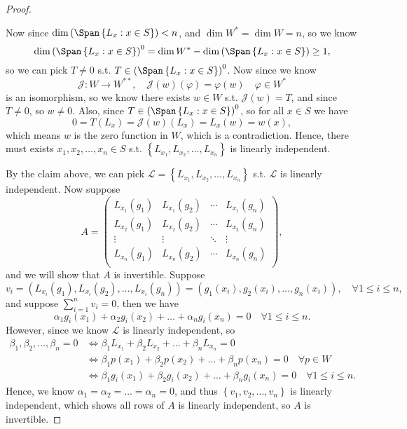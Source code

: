 \begin{proof}
\begin{explanation}
        Now since \(\dim \left( \Span \left\{ L_x: x \in S \right\}  \right) < n \), and \(\dim W^* = \dim W = n\), so we know 
        \[
            \dim \left( \Span \left\{ L_x : x \in S \right\}  \right)^0 = \dim W^* - \dim \left( \Span \left\{ L_x: x \in S \right\}  \right) \ge 1, 
        \] so we can pick \(T \neq 0\) s.t. \(T \in \left( \Span \left\{ L_x: x \in S \right\}  \right)^0 \). Now since we know 
        \[
            \mathcal{J} : W \to W^{* *}, \quad \mathcal{J} (w) (\varphi ) = \varphi (w) \quad \varphi \in W^*
        \] is an isomorphism, so we know there exists \(w \in W\) s.t. \(\mathcal{J} (w) = T\), and since \(T \neq 0\), so \(w \neq 0\). Also, since \(T \in \left( \Span \left\{ L_x : x \in S \right\}  \right)^0 \), so for all \(x \in S\) we have 
        \[
            0 = T(L_x) = \mathcal{J} (w) (L_x) = L_x(w) = w(x),
        \] which means \(w\) is the zero function in \(W\), which is a contradiction. Hence, there must exists \(x_1, x_2, \dots , x_n \in S\) s.t. \(\left\{ L_{x_1}, L_{x_2}, \dots , L_{x_n} \right\} \) is linearly independent. 
    \end{explanation} 
    By the claim above, we can pick \(\mathcal{L} = \left\{ L_{x_1}, L_{x_2}, \dots , L_{x_n} \right\} \) s.t. \(\mathcal{L} \) is linearly independent. Now suppose 
    \[
        A = \begin{pmatrix}
            L_{x_1}(g_1) & L_{x_1}(g_2) &  \cdots & L_{x_1}(g_n)  \\
            L_{x_2}(g_1) & L_{x_2}(g_2) & \cdots & L_{x_2}(g_n)  \\
            \vdots & \vdots & \ddots & \vdots  \\
            L_{x_n}(g_1) & L_{x_n}(g_2) & \cdots & L_{x_n}(g_n)  \\
        \end{pmatrix},
    \] and we will show that \(A\) is invertible. Suppose 
    \[
        v_i = \left( L_{x_i}(g_1), L_{x_i}(g_2), \dots , L_{x_i}(g_n) \right) = \left( g_1(x_i), g_2(x_i), \dots, g_n(x_i)  \right),  \quad \forall 1 \le i \le n, 
    \] and suppose \(\sum_{i=1}^n v_i = 0 \), then we have 
    \[
        \alpha _1 g_i(x_1) + \alpha _2 g_i (x_2) + \dots + \alpha _n g_i(x_n) = 0 \quad \forall 1 \le i \le n.
    \] 
    However, since we know \(\mathcal{L} \) is linearly independent, so 
    \begin{align*}
        \beta _1, \beta _2, \dots , \beta _n = 0 &\iff \beta _1 L_{x_1} + \beta _2 L_{x_2} + \dots + \beta _n L_{x_n} = 0 \\
        &\iff \beta _1 p(x_1) + \beta _2 p(x_2) + \dots + \beta _n p(x_n) = 0 \quad \forall p \in W \\
        &\iff \beta _1 g_i(x_1) + \beta _2 g_i(x_2) + \dots + \beta _n g_i(x_n) = 0 \quad \forall 1 \le i \le n.
    \end{align*} 
    Hence, we know \(\alpha _1 = \alpha _2 = \dots = \alpha _n = 0\), and thus \(\left\{ v_1, v_2, \dots , v_n \right\} \) is linearly independent, which shows all rows of \(A\) is linearly independent, so \(A\) is invertible.
    

\end{proof}
